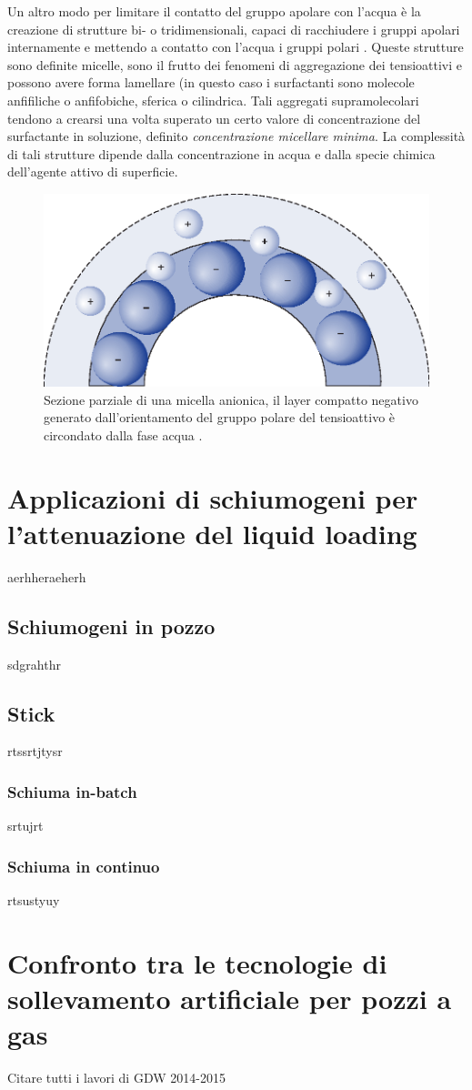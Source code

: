 Un altro modo per limitare il contatto del gruppo apolare con l'acqua è la creazione di strutture bi- o tridimensionali, capaci di racchiudere i gruppi apolari internamente e mettendo a contatto con l'acqua i gruppi polari . Queste strutture sono definite micelle, sono il frutto dei fenomeni di aggregazione dei tensioattivi e possono avere forma lamellare (in questo caso i surfactanti sono molecole anfifiliche o anfifobiche, sferica o cilindrica.  Tali aggregati supramolecolari tendono a crearsi una volta superato un certo valore di concentrazione del surfactante in soluzione, definito \textit{concentrazione micellare minima}. La complessità di tali strutture dipende dalla concentrazione in acqua e dalla specie chimica dell'agente attivo di superficie.

\begin{figure}[htbp]
    \centering
    \includegraphics[width=.5\textwidth]{fig/foamer/micelle.eps}
    \caption{Sezione parziale di una micella anionica, il layer compatto negativo generato dall'orientamento del gruppo polare del tensioattivo è circondato dalla fase acqua  \parencite{attwood2012fasttrack}.}
    \label{fig:micelle}
\end{figure}



\section{Applicazioni di schiumogeni per l'attenuazione del liquid loading}
aerhheraeherh

\subsection{Schiumogeni in pozzo}
sdgrahthr
\subsection{Stick}
rtssrtjtysr
\subsubsection{Schiuma in-batch}
srtujrt
\subsubsection{Schiuma in continuo}
rtsustyuy

\section{Confronto tra le tecnologie di sollevamento artificiale per pozzi a gas}
Citare tutti i lavori di GDW 2014-2015